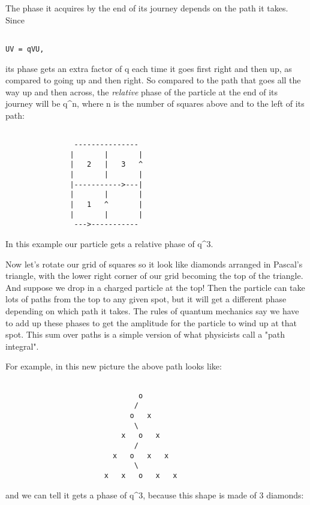 The phase it acquires by the end of its journey depends on the path it 
takes.  Since 


\begin{verbatim}

UV = qVU, 
\end{verbatim}
    
its phase gets an extra factor of q each time it goes first right and
then up, as compared to going up and then right.  So compared to the
path that goes all the way up and then across, the \emph{relative} phase 
of the particle at the end of its journey will be q^{n}, where n is the
number of squares above and to the left of its path:


\begin{verbatim}

                ---------------
               |       |       |
               |   2   |   3   ^
               |       |       |
               |----------->---|
               |       |       |
               |   1   ^       |
               |       |       | 
                --->-----------
\end{verbatim}
    
In this example our particle gets a relative phase of q^{3}.

Now let's rotate our grid of squares so it look like diamonds arranged
in Pascal's triangle, with the lower right corner of our grid becoming
the top of the triangle.  And suppose we drop in a charged particle at
the top!  Then the particle can take lots of paths from the top to any
given spot, but it will get a different phase depending on which path 
it takes.  The rules of quantum mechanics say we have to add up these
phases to get the amplitude for the particle to wind up at that spot. 
This sum over paths is a simple version of what physicists call a 
"path integral".  

For example, in this new picture the above path looks like:


\begin{verbatim}

                               o
                              / 
                             o   x
                              \   
                           x   o   x
                              /       
                         x   o   x   x
                              \    
                       x   x   o   x   x
\end{verbatim}
    
and we can tell it gets a phase of q^{3}, because this shape is
made of 3 diamonds:


